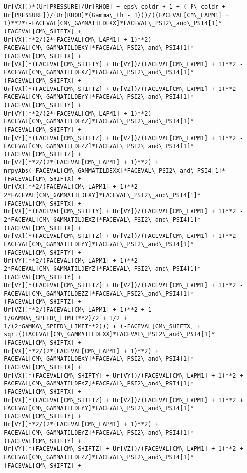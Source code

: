 \documentclass[landscape,letterpaper,10pt,english]{article}
\begin{document}
\begin{Verbatim}[commandchars=\\\{\}]
Ur[VX]))*(Ur[PRESSURE]/Ur[RHOB] + eps\_coldr + 1 + (-P\_coldr +
Ur[PRESSURE])/(Ur[RHOB]*(Gamma\_th - 1)))/((FACEVAL[CM\_LAPM1] +
1)**2*(-FACEVAL[CM\_GAMMATILDEXX]*FACEVAL\_PSI2\_and\_PSI4[1]*(FACEVAL[CM\_SHIFTX] +
Ur[VX])**2/(2*(FACEVAL[CM\_LAPM1] + 1)**2) -
FACEVAL[CM\_GAMMATILDEXY]*FACEVAL\_PSI2\_and\_PSI4[1]*(FACEVAL[CM\_SHIFTX] +
Ur[VX])*(FACEVAL[CM\_SHIFTY] + Ur[VY])/(FACEVAL[CM\_LAPM1] + 1)**2 -
FACEVAL[CM\_GAMMATILDEXZ]*FACEVAL\_PSI2\_and\_PSI4[1]*(FACEVAL[CM\_SHIFTX] +
Ur[VX])*(FACEVAL[CM\_SHIFTZ] + Ur[VZ])/(FACEVAL[CM\_LAPM1] + 1)**2 -
FACEVAL[CM\_GAMMATILDEYY]*FACEVAL\_PSI2\_and\_PSI4[1]*(FACEVAL[CM\_SHIFTY] +
Ur[VY])**2/(2*(FACEVAL[CM\_LAPM1] + 1)**2) -
FACEVAL[CM\_GAMMATILDEYZ]*FACEVAL\_PSI2\_and\_PSI4[1]*(FACEVAL[CM\_SHIFTY] +
Ur[VY])*(FACEVAL[CM\_SHIFTZ] + Ur[VZ])/(FACEVAL[CM\_LAPM1] + 1)**2 -
FACEVAL[CM\_GAMMATILDEZZ]*FACEVAL\_PSI2\_and\_PSI4[1]*(FACEVAL[CM\_SHIFTZ] +
Ur[VZ])**2/(2*(FACEVAL[CM\_LAPM1] + 1)**2) +
nrpyAbs(-FACEVAL[CM\_GAMMATILDEXX]*FACEVAL\_PSI2\_and\_PSI4[1]*(FACEVAL[CM\_SHIFTX] +
Ur[VX])**2/(FACEVAL[CM\_LAPM1] + 1)**2 -
2*FACEVAL[CM\_GAMMATILDEXY]*FACEVAL\_PSI2\_and\_PSI4[1]*(FACEVAL[CM\_SHIFTX] +
Ur[VX])*(FACEVAL[CM\_SHIFTY] + Ur[VY])/(FACEVAL[CM\_LAPM1] + 1)**2 -
2*FACEVAL[CM\_GAMMATILDEXZ]*FACEVAL\_PSI2\_and\_PSI4[1]*(FACEVAL[CM\_SHIFTX] +
Ur[VX])*(FACEVAL[CM\_SHIFTZ] + Ur[VZ])/(FACEVAL[CM\_LAPM1] + 1)**2 -
FACEVAL[CM\_GAMMATILDEYY]*FACEVAL\_PSI2\_and\_PSI4[1]*(FACEVAL[CM\_SHIFTY] +
Ur[VY])**2/(FACEVAL[CM\_LAPM1] + 1)**2 -
2*FACEVAL[CM\_GAMMATILDEYZ]*FACEVAL\_PSI2\_and\_PSI4[1]*(FACEVAL[CM\_SHIFTY] +
Ur[VY])*(FACEVAL[CM\_SHIFTZ] + Ur[VZ])/(FACEVAL[CM\_LAPM1] + 1)**2 -
FACEVAL[CM\_GAMMATILDEZZ]*FACEVAL\_PSI2\_and\_PSI4[1]*(FACEVAL[CM\_SHIFTZ] +
Ur[VZ])**2/(FACEVAL[CM\_LAPM1] + 1)**2 + 1 - 1/GAMMA\_SPEED\_LIMIT**2)/2 + 1/2 +
1/(2*GAMMA\_SPEED\_LIMIT**2))) + (-FACEVAL[CM\_SHIFTX] +
sqrt((FACEVAL[CM\_GAMMATILDEXX]*FACEVAL\_PSI2\_and\_PSI4[1]*(FACEVAL[CM\_SHIFTX] +
Ur[VX])**2/(2*(FACEVAL[CM\_LAPM1] + 1)**2) +
FACEVAL[CM\_GAMMATILDEXY]*FACEVAL\_PSI2\_and\_PSI4[1]*(FACEVAL[CM\_SHIFTX] +
Ur[VX])*(FACEVAL[CM\_SHIFTY] + Ur[VY])/(FACEVAL[CM\_LAPM1] + 1)**2 +
FACEVAL[CM\_GAMMATILDEXZ]*FACEVAL\_PSI2\_and\_PSI4[1]*(FACEVAL[CM\_SHIFTX] +
Ur[VX])*(FACEVAL[CM\_SHIFTZ] + Ur[VZ])/(FACEVAL[CM\_LAPM1] + 1)**2 +
FACEVAL[CM\_GAMMATILDEYY]*FACEVAL\_PSI2\_and\_PSI4[1]*(FACEVAL[CM\_SHIFTY] +
Ur[VY])**2/(2*(FACEVAL[CM\_LAPM1] + 1)**2) +
FACEVAL[CM\_GAMMATILDEYZ]*FACEVAL\_PSI2\_and\_PSI4[1]*(FACEVAL[CM\_SHIFTY] +
Ur[VY])*(FACEVAL[CM\_SHIFTZ] + Ur[VZ])/(FACEVAL[CM\_LAPM1] + 1)**2 +
FACEVAL[CM\_GAMMATILDEZZ]*FACEVAL\_PSI2\_and\_PSI4[1]*(FACEVAL[CM\_SHIFTZ] +

\end{Verbatim}
\end{document}
